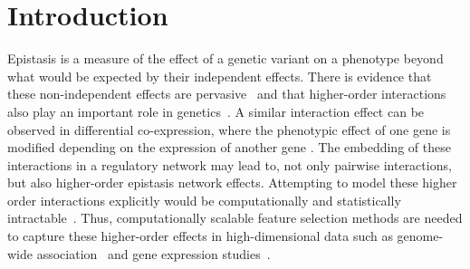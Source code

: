 \documentclass[10pt]{article}
\begin{document}
\begin{abstract}
\\

\end{abstract}

\linenumbers

\section{Introduction}

Epistasis is a measure of the effect of a genetic variant on a phenotype beyond what would be expected by their independent effects. There is evidence that these non-independent effects are pervasive~\cite{breen12} and that higher-order interactions also play an important role in genetics~\cite{weinreich13}. 
A similar interaction effect can be observed in differential co-expression, where the phenotypic effect of one gene is modified depending on the expression of another gene \cite{lareau15,diffcoexp10}.
The embedding of these interactions in a regulatory network may lead to, not only pairwise interactions, but also higher-order epistasis network effects. Attempting to model these higher order interactions explicitly would be computationally and statistically intractable~\cite{riesselman18}.
Thus, computationally scalable feature selection methods are needed to capture these higher-order effects in high-dimensional data such as genome-wide association~\cite{titv} and gene expression studies~\cite{stir}.
\end{document}
